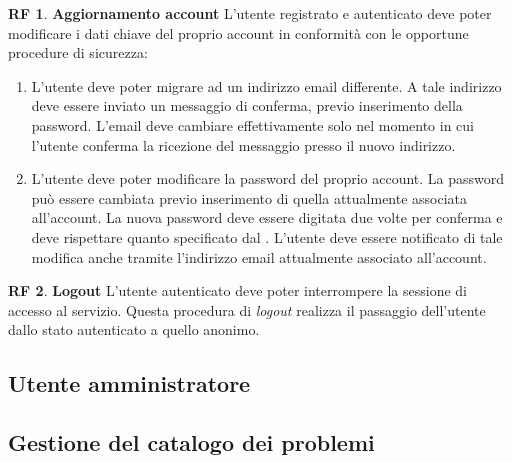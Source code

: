 \documentclass[11pt, a4paper]{article}
\theoremstyle{definition}
\newtheorem{funcreq}{RF} %
\begin{document}
\begin{funcreq}
\label{updateaccount}
\textbf{Aggiornamento account }
L'utente registrato e autenticato deve poter modificare i dati chiave del
proprio account in conformità con le opportune procedure di sicurezza:
\begin{enumerate}
\item L'utente deve poter migrare ad un indirizzo email differente. A tale
indirizzo deve essere inviato un messaggio di conferma, previo inserimento
della password. L'email
deve cambiare effettivamente solo nel momento in cui l'utente conferma la
ricezione del messaggio presso il nuovo indirizzo.

\item L'utente deve poter modificare la password del proprio account.
La password può essere cambiata previo inserimento di quella attualmente
associata all'account. La nuova password deve essere digitata due volte
per conferma e deve rispettare quanto specificato dal
\textcolor{blue}{}. 
L'utente deve essere notificato di tale modifica anche tramite
l'indirizzo email attualmente associato all'account.
\end{enumerate}
\end{funcreq}
    
\begin{funcreq}
\label{logout}
\textbf{Logout }
L'utente autenticato deve poter interrompere la sessione di accesso
al servizio. Questa procedura di \textit{logout} realizza il passaggio dell'utente
dallo stato autenticato a quello anonimo.
\end{funcreq}

\begin{center}
    \section*{Utente amministratore}
\end{center}

\subsection{Gestione del catalogo dei problemi}
\end{document}
